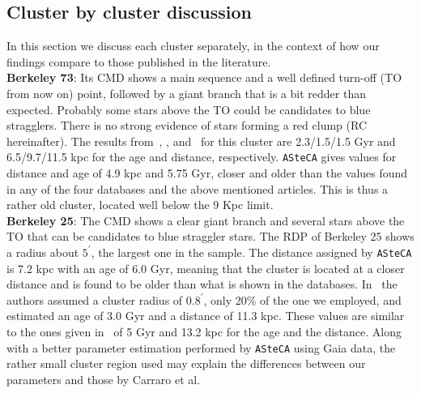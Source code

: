 \documentclass[draft]{aa}
\begin{document}
 \subsection{Cluster by cluster discussion}
  \label{ssec:indiv_clusters}

  In this section we discuss each cluster separately, in the context of how our
  findings compare to those published in the literature.\\

  \noindent \textbf{Berkeley 73}: Its CMD shows a main sequence and a well
  defined turn-off (TO from now on) point, followed by a giant branch that is a
  bit redder than expected. Probably some stars above the TO could be candidates
  to blue stragglers. There is no strong evidence of stars forming a red clump 
  (RC hereinafter).
  The results from~\cite{Ortolani_2005}, \cite{Carraro_2005},
  and~\cite{Carraro_2007_oldOC} for this cluster are 2.3/1.5/1.5 Gyr and
  6.5/9.7/11.5 kpc for the age and distance, respectively.
  \texttt{ASteCA} gives values for distance and age of 4.9 kpc and 5.75 Gyr,
  closer and older than the values found in any of the four databases and the
  above mentioned articles. This is thus a rather old cluster, located well
  below the 9 Kpc limit.\\

  \textbf{Berkeley 25}: The CMD shows a clear giant branch and several stars
  above the TO that can be candidates to blue straggler stars. The RDP of
  Berkeley 25 shows a radius about $5^{\prime}$, the largest one in the sample.
  The distance assigned by \texttt{ASteCA} is 7.2 kpc with an age of 6.0 Gyr,
  meaning that the cluster is located at a closer distance and is found to be
  older than what is shown in the databases.
  In~\cite{Carraro_2005} the authors assumed a cluster radius of $0.8^{\prime}$,
  only 20\% of the one we employed, and estimated an age of 3.0 Gyr and a
  distance of 11.3 kpc. These values are similar to the ones given
  in~\cite{Carraro_2007_oldOC} of 5 Gyr and 13.2 kpc for the age and the
  distance.
  Along with a better parameter estimation performed by \texttt{ASteCA} using
  Gaia data, the rather small cluster region used may explain the differences
  between our parameters and those by Carraro et al.\\
\end{document}

